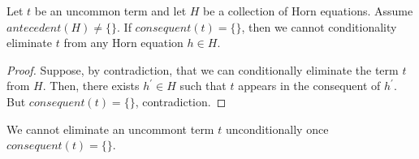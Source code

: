 \begin{theorem}
  Let $t$ be an uncommon term and let $H$ be a collection of Horn equations.
  Assume $antecedent(H) \neq \{\}$. If $consequent(t) = \{\}$, then we cannot
  conditionality eliminate $t$ from any Horn equation $h \in H$. 
\end{theorem}

\begin{proof}
  Suppose, by contradiction, that we can conditionally eliminate the term
  $t$ from $H$. Then, there exists $h^{'} \in H$ such that $t$ appears in the
  consequent of $h^{'}$. But $consequent(t) = \{\}$, contradiction.
\end{proof}

\begin{corollary}
  We cannot eliminate an uncommont term $t$ unconditionally once
  $consequent(t) = \{\}$.
\end{corollary}


